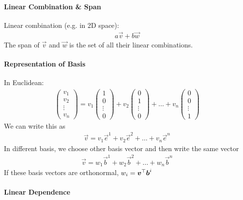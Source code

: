 \paragraph{Linear Combination \& Span}

Linear combination (e.g. in 2D space):
\begin{align*}
	a\vec{v}+b\vec{w}
\end{align*}
The span of $\vec{v}$ and $\vec{w}$ is the set of all their linear combinations.

\paragraph{Representation of Basis}

In Euclidean:
\begin{align*}
\begin{pmatrix}
v_1 \\ v_2 \\ \vdots \\ v_n
\end{pmatrix}=v_1\begin{pmatrix}
1 \\ 0 \\ \vdots \\ 0
\end{pmatrix}+v_2\begin{pmatrix}
0 \\ 1 \\ \vdots \\ 0
\end{pmatrix}+\dots+v_n\begin{pmatrix}
0 \\ 0 \\ \vdots \\ 1
\end{pmatrix}
\end{align*}
We can write this as
\begin{align*}
	\vec{v}=v_1\vec{e}^1+v_2\vec{e}^2+\dots+v_n\vec{e}^n
\end{align*}
In different basis, we choose other basis vector and then write the same vector
\begin{align*}
	\vec{v}=w_1\vec{b}^1+w_2\vec{b}^2+\dots+w_n\vec{b}^n
\end{align*}
If these basis vectors are orthonormal, $w_i=\boldsymbol{v}{}^\top\boldsymbol{b}^i$

\paragraph{Linear Dependence}

